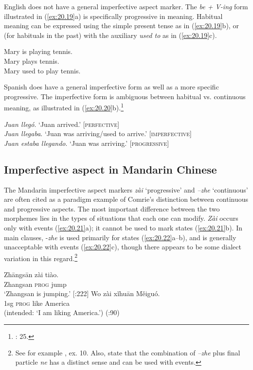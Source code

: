 English does not have a general imperfective aspect marker. The \textit{be + V-ing} form illustrated in (\ref{ex:20.19}a) is specifically progressive in meaning. Habitual meaning can be expressed using the simple present tense as in (\ref{ex:20.19}b), or (for habituals in the past) with the auxiliary \textit{used to} as in (\ref{ex:20.19}c).


\ea \label{ex:20.19}
\ea  Mary is playing tennis.\\
\ex Mary plays tennis.\\
\ex Mary used to play tennis.
                       \z
\z


Spanish does have a general imperfective form as well as a more specific progressive. The imperfective form is ambiguous between habitual vs. continuous meaning, as illustrated in (\ref{ex:20.20}b).\footnote{\citealt{Comrie1976}: 25.}


\ea \label{ex:20.20}
\ea  \textit{Juan llegó}.  ‘Juan arrived.’  [\textsc{perfective}]\\
\ex \textit{Juan llegaba}.  ‘Juan was arriving/used to arrive.’  [\textsc{imperfective}]\\
\ex \textit{Juan estaba llegando}.  ‘Juan was arriving.’  [\textsc{progressive}]
                       \z
\z

\subsection{Imperfective aspect in Mandarin Chinese}\label{sec:20.4.2}

The Mandarin imperfective aspect markers \textit{zài} ‘progressive’ and \textit{–zhe} ‘continuous’ are often cited as a paradigm example of Comrie’s distinction between continuous and progressive aspects. The most important difference between the two morphemes lies in the types of situations that each one can modify. \textit{Zài} occurs only with events (\ref{ex:20.21}a); it cannot be used to mark states (\ref{ex:20.21}b). In main clauses, -\textit{zhe} is used primarily for states (\ref{ex:20.22}a--b), and is generally unacceptable with events (\ref{ex:20.22}c), though there appears to be some dialect variation in this regard.\footnote{See for example \citet[738]{KleinEtAl2000}, ex. 10. Also, \citet{LiThompson1981} state that the combination of \textit{–zhe} plus final particle \textit{ne} has a distinct sense and can be used with events.}

\ea \label{ex:20.21}
\ea  \gll  Zh\=angs\=an  zài  tiào.\\
Zhangsan  \textsc{prog}  jump\\
\glt ‘Zhangsan is jumping.’   [\citealt{LiThompson1981}:222]
\ex \gll  *Wo  zài  xǐhu\=an  Měiguó.\\
  1sg  \textsc{prog}  like  America\\
\glt (intended: ‘I am liking America.’)  (\citealt{Sun2011}:90)
\z \z

